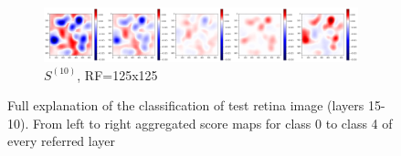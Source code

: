 \documentclass[preprint]{elsarticle}
\theoremstyle{definition} %
\theoremstyle{remark}
\begin{document}
\begin{figure}[h!]
	\begin{subfigure}[b]{\textwidth}
		\includegraphics[width=\textwidth]{figures/score_prop_23713_left/score_rf125.png}
		\caption{$S^{(10)}$, RF=125x125}
		\label{fig:score_rf125}
	\end{subfigure}
	
	\caption{Full explanation of the classification of test retina image (layers 15-10). From left to right aggregated score maps for class 0 to class 4 of every referred layer}
	\label{fig:test1_score_explanation_rf}
\end{figure}
\end{document}
